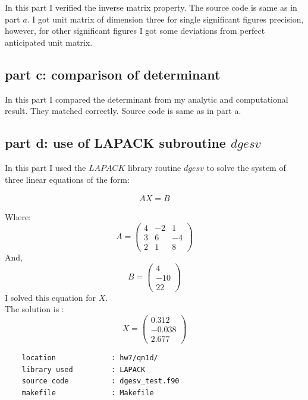 \documentclass[11pt,a4paper,english]{article}
\begin{document}
    In this part I verified the inverse matrix property. The source code is same as in part $a$.
    I got unit matrix of dimension three for single significant figures precision, however, for other 
    significant figures I got some deviations from perfect anticipated unit matrix.

   \subsection{part c: comparison of determinant}
   In this part I compared the determinant from my analytic and computational result. They matched
   correctly. Source code is same as in part a.	
	
	
	\subsection{part d: use of LAPACK subroutine $dgesv$ }
    In this part I used the $LAPACK$ library routine $ dgesv$ to solve the system of three linear equations
    of the form:
    
    \begin{eqnarray}
     AX=B
     \end{eqnarray}
      
	Where:\\
	    \begin{displaymath}
      A=
  		\begin{pmatrix}
    			4 & -2 & 1 \\
    			3 &  6 & -4 \\
    			2 &  1 &  8 
  		\end{pmatrix}
	\end{displaymath}
	And,
	    \begin{displaymath}
      B=
  		\begin{pmatrix}
    			4 \\
    		  -10 \\
    		   22 
  		\end{pmatrix}
	\end{displaymath}
	I solved this equation for $X$.\\
	The solution is :\\
	\begin{displaymath}
      X=
  		\begin{pmatrix}
    			0.312 \\
    		  -0.038 \\
    		   2.677 
  		\end{pmatrix}
	\end{displaymath}
	\begin{verbatim}
	location             : hw7/qn1d/
	library used         : LAPACK
	source code          : dgesv_test.f90
	makefile             : Makefile
	\end{verbatim}
	
\end{document}
